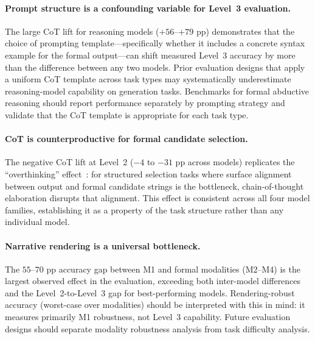 \documentclass{article}
\theoremstyle{definition}
\begin{document}
\paragraph{Prompt structure is a confounding variable for Level~3 evaluation.} The large CoT lift for reasoning models ($+56$--$+79$ pp) demonstrates that the choice of prompting template---specifically whether it includes a concrete syntax example for the formal output---can shift measured Level~3 accuracy by more than the difference between any two models. Prior evaluation designs that apply a uniform CoT template across task types may systematically underestimate reasoning-model capability on generation tasks. Benchmarks for formal abductive reasoning should report performance separately by prompting strategy and validate that the CoT template is appropriate for each task type.

\paragraph{CoT is counterproductive for formal candidate selection.} The negative CoT lift at Level~2 ($-4$ to $-31$ pp across models) replicates the ``overthinking'' effect~\cite{chen2024overthinking}: for structured selection tasks where surface alignment between output and formal candidate strings is the bottleneck, chain-of-thought elaboration disrupts that alignment. This effect is consistent across all four model families, establishing it as a property of the task structure rather than any individual model.

\paragraph{Narrative rendering is a universal bottleneck.} The $55$--$70$ pp accuracy gap between M1 and formal modalities (M2--M4) is the largest observed effect in the evaluation, exceeding both inter-model differences and the Level~2-to-Level~3 gap for best-performing models. Rendering-robust accuracy (worst-case over modalities) should be interpreted with this in mind: it measures primarily M1 robustness, not Level~3 capability. Future evaluation designs should separate modality robustness analysis from task difficulty analysis.
\end{document}
